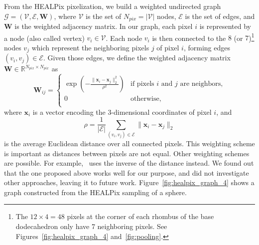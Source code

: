 \documentclass[final,twocolumn,3p,times,sort&compress]{elsarticle}
\newcommand{\figref}[1]{Figure~\ref{fig:#1}}
\renewcommand{\b}[1]{{\bm{#1}}}   %
\newcommand{\1}{\b{1}}              %
\newcommand{\0}{\b{0}}              %
\newcommand{\G}{\mathcal{G}}
\newcommand{\V}{\mathcal{V}}
\newcommand{\E}{\mathcal{E}}
\newcommand{\W}{\b{W}}
\newcommand{\x}{\b{x}}
\newcommand{\R}{\mathbb{R}}
\begin{document}
From the HEALPix pixelization, we build a weighted undirected graph $\G = (\V, \E, \W)$, where $\V$ is the set of $N_{pix} = |\V|$ nodes, $\E$ is the set of edges, and $\W$ is the weighted adjacency matrix.
In our graph, each pixel $i$ is represented by a node (also called vertex) $v_i \in \V$.
Each node $v_i$ is then connected to the $8$ (or $7$)\footnote{\label{neighbors}The $12 \times 4 = 48$ pixels at the corner of each rhombus of the base dodecahedron only have 7 neighboring pixels. See Figures~\ref{fig:healpix_graph_4} and~\ref{fig:pooling}.} nodes $v_j$ which represent the neighboring pixels $j$ of pixel $i$, forming edges $(v_i, v_j) \in \E$. Given those edges, we define the weighted adjacency matrix $\W \in \R^{N_{pix} \times N_{pix}}$ as
\begin{equation*}
	\W_{ij} = \begin{cases}
		\exp \left( -\frac{\|\x_i-\x_j\|_2^2}{\rho^2} \right) & \text{if pixels $i$ and $j$ are neighbors,} \\
		0 & \text{otherwise,} \\
	\end{cases}
\end{equation*}
where $\x_i$ is a vector encoding the 3-dimensional coordinates of pixel $i$, and
\begin{equation*}
	\rho = \frac{1}{|\E|} \sum_{(v_i, v_j) \in \E} \|\x_i-\x_j\|_2
\end{equation*}
is the average Euclidean distance over all connected pixels. This weighting scheme is important as distances between pixels are not equal.
Other weighting schemes are possible. For example,~\cite{khasanova2017graphomni} uses the inverse of the distance instead. We found out that the one proposed above works well for our purpose, and did not investigate other approaches, leaving it to future work.
\figref{healpix_graph_4} shows a graph constructed from the HEALPix sampling of a sphere.

\end{document}
